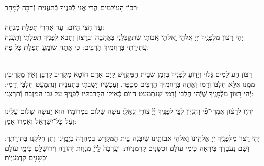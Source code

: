 \documentclass[twoside, openany, parskip=half, 11pt]{book}
\begin{document}
\begin{sometimes}

\\
רִבּוֹן הָעוֹלָמִים הֲרֵי אֲנִי לְֿפָנֶיךָ בְּֿתַעֲנִית נְֿדָבָה לְֿמָחָר:\\
\\
עַד חֲצִי הַיּוֹם:  עַד אַחֲרֵי תְּֿפִלַת מִנְחָה:\\
יְֿהִי רָצוֹן מִלְּֿפָנֶֽיךָ יְיָ אֱלֹהַי וֵאלֹהֵי אֲבוֹתַי שֶׁתְּֿקַבְּֿלֵֽנִי בְּֿאַהֲבָה וּבְרָצוֹן וְֿתָבֹא לְֿפָנֶיךָ תְּֿפִלָתִי
וְֿתַעֲנֶה עֲתִירָתִי בְּֿרַחֲמֶֽיךָ הָרַבִּים: כִּי אַתָּה שׁוֹמֵֽעַ תְּֿפִלַת כָּל פֶּה: 

\sepline

\nextpage
{}\\
רִבּוֹן הָעוֹלָמִים גָּלוּי וְֿיָדֽוּעַ לְֿפָנֶיךָ בִּזְמַן שֶׁבֵּית הַמִּקְדָּשׁ קַיָּם אָדָם חוֹטֵא מַקְרִיב קָרְֿבָּן וְֿאֵין מַקְרִיבִין מִמֶּֽנּוּ אֶלָּא חֶלְבּוֹ וְֿדָמוֹ וְֿאַתָּה בְּֿרַחֲמֶֽיךָ הָרַבִּים מְֿכַפֵּר. וְֿעַכְשָׁיו יָשַֽׁבְתִּי בְּֿתַעֲנִית וְֿנִתְמַעֵט חֶלְבִּי וְֿדָמִי: יְֿהִי רָצוֹן מִלְּֿפָנֶֽיךָ שֶׁיְּֿהִי חֶלְבִּי וְֿדָמִי שֶׁנִּתְמַעַט הַיּוֹם כְּֿאִילּוּ הִקְרַבְתִּיו לְֿפָנֶֽיךָ עַל גַּבֵּי הַמִּזְבֵּֽחַ וְֿתִרְצֵֽנִי:


\end{sometimes}

יִֽהְי֥וּ לְֿרָצ֨וֹן אִמְרֵי־פִ֡י וְהֶגְי֣וֹן לִבִּ֣י לְֿפָנֶ֑יךָ יְ֜יָ֗ צוּרִ֥י וְֿגֹֽאֲלִֽי׃ עֹשֶׂה שָׁלוֹם בִּמְרוֹמָיו הוּא יַעֲשֶׂה שָׁלוֹם עָלֵֽינוּ וְֿעַל כׇּל־יִשְׂרָאֵל וְֿאִמְרוּ אָמֵן:


\begin{small}

יְֿהִי רָצוֹן מִלְּֿפָנֶֽיךָ יְיָ אֱלֹהֵֽינוּ וִֵאלֹהֵי אֲבוֹתֵֽינוּ שֶׁיִבָּנֶה בֵּית הַמִּקְדָּשׁ בִּמְהֵרָה בְֿיָמֵֽינוּ וְֿתֵן חֶלְקֵֽנוּ בְּֿתוֹרָתֶֽךָ: וְֿשָׁם נַעֲבָדְֿךָ בְּֿיִרְאָה כִּימֵי עוֹלָם וּכְשָׁנִים קַדְמֹנִיּוֹת:
וְֿעָֽרְֿבָה֙ לַֽיְֿיָ֔ מִנְחַ֥ת יְֿהוּדָ֖ה וִירוּשָׁלָ֑םִ כִּימֵ֣י עוֹלָ֔ם וּכְשָׁנִ֖ים קַדְמֹֽנִיּֽוֹת׃


\end{small}



\\
\end{document}
